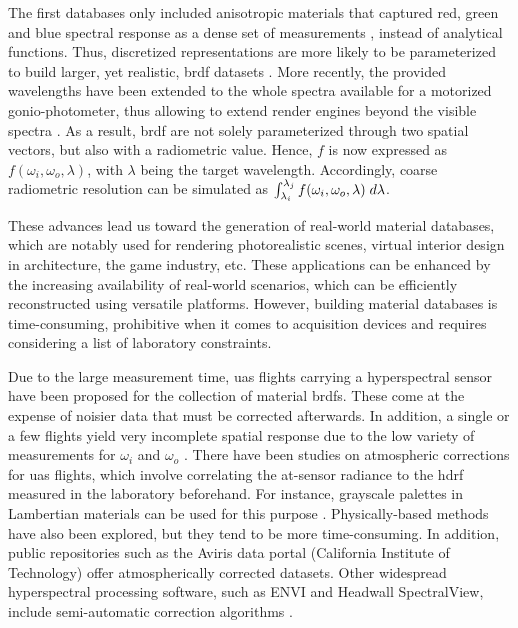 The first databases only included anisotropic materials that captured red, green and blue spectral response as a dense set of measurements \cite{matusik_data-driven_2003}, instead of analytical functions. Thus, discretized representations are more likely to be parameterized to build larger, yet realistic, \acrshort{brdf} datasets \cite{serrano_intuitive_2016}. More recently, the provided wavelengths have been extended to the whole spectra available for a motorized gonio-photometer, thus allowing to extend render engines beyond the visible spectra \cite{dupuy_adaptive_2018}. As a result, \acrshort{brdf} are not solely parameterized through two spatial vectors, but also with a radiometric value. Hence, $f$ is now expressed as $f(\omega_i, \omega_o, \lambda)$, with $\lambda$ being the target wavelength. Accordingly, coarse radiometric resolution can be simulated as $\int_{\lambda_i}^{\lambda_j} f(\omega_i, \omega_o, \lambda) \hspace{1mm} d\lambda$. 

These advances lead us toward the generation of real-world material databases, which are notably used for rendering photorealistic scenes, virtual interior design in architecture, the game industry, etc. These applications can be enhanced by the increasing availability of real-world scenarios, which can be efficiently reconstructed using versatile platforms. However, building material databases is time-consuming, prohibitive when it comes to acquisition devices and requires considering a list of laboratory constraints. 

Due to the large measurement time, \acrshort{uas} flights carrying a hyperspectral sensor have been proposed for the collection of material \acrshort{brdf}s. These come at the expense of noisier data that must be corrected afterwards. In addition, a single or a few flights yield very incomplete spatial response due to the low variety of measurements for $\omega_i$ and $\omega_o$ \cite{jurado_efficient_2022}. There have been studies on atmospheric corrections for \acrshort{uas} flights, which involve correlating the at-sensor radiance to the \acrshort{hdrf} measured in the laboratory beforehand. For instance, grayscale palettes in Lambertian materials can be used for this purpose  \cite{lucieer_hyperuasimaging_2014}. Physically-based methods have also been explored, but they tend to be more time-consuming. In addition, public repositories such as the Aviris data portal (California Institute of Technology) \cite{california_institute_of_technology_aviris_nodate} offer atmospherically corrected datasets. Other widespread hyperspectral processing software, such as ENVI and Headwall SpectralView, include semi-automatic correction algorithms \cite{queally_flexbrdf_2022, jia_kernel-driven_2020, sagan_data-driven_2022}.

